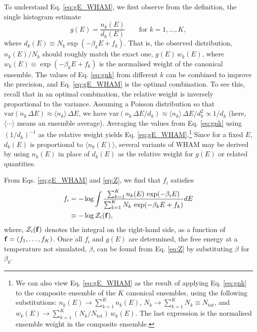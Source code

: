 \documentclass{gMOS2e}
\begin{document}
To understand Eq. \eqref{eq:gE_WHAM},
we first observe from the definition,
the single histogram estimate
%
\begin{equation}
g(E)
=
\frac{ n_k(E) }
     { d_k(E) }
\qquad
\mbox{for $k = 1, \dots, K$},
\label{eq:gnk}
\end{equation}
where $d_k(E) \equiv N_k \exp(-\beta_k E + f_k)$.
%
That is,
the observed distribution, $n_k(E)/N_k$
should roughly match the exact one, $g(E) \, w_k(E)$,
where $w_k(E) \equiv \exp(-\beta_k E + f_k)$
is the normalised weight of the canonical ensemble.
%
The values of Eq. \eqref{eq:gnk} from different $k$
can be combined to improve the precision,
and Eq. \eqref{eq:gE_WHAM}
is the optimal combination\cite{
roux1995, souaille2001, newman, frenkel}.
%
To see this,
recall that in an optimal combination,
the relative weight is inversely
proportional to the variance.
%
Assuming a Poisson distribution
so that $\mathrm{var}(n_k \, \Delta E) \approx \langle n_k \rangle \, \Delta E$,
%
%
we have
$\mathrm{var}(n_k \, \Delta E / d_k) \approx \langle n_k \rangle \, \Delta E/ d_k^2 \propto 1/ d_k$
(here, $\langle \cdots \rangle$ means an ensemble average).
%
Averaging the values from Eq. \eqref{eq:gnk}
using $(1/d_k)^{-1}$ as the relative weight yields
Eq. \eqref{eq:gE_WHAM}.\footnote{
We can also view Eq. \eqref{eq:gE_WHAM}
as the result of applying Eq. \eqref{eq:gnk}
to the composite ensemble of the $K$ canonical ensembles,
using the following substitutions:
$n_k(E) \rightarrow \sum_{k = 1}^K n_k(E)$,
$N_k \rightarrow \sum_{k = 1}^K N_k \equiv N_\mathrm{tot}$,
and
$w_k(E) \rightarrow \sum_{k = 1}^K (N_k/N_\mathrm{tot}) \, w_k(E)$.
%
The last expression is the normalised ensemble weight
in the composite ensemble.}
%
%
Since for a fixed $E$,
$d_k(E)$ is proportional to $\langle n_k(E) \rangle$,
several variants of WHAM
may be derived
by using $n_k(E)$ in place of $d_k(E)$
as the relative weight for
$g(E)$\cite{
shen1991}
or related quantities\cite{
woolf1994, crouzy1994, roux1995,
kastner2005, kastner2009, fenwick2008, kim2011}.
%




From Eqs. \eqref{eq:gE_WHAM} and \eqref{eq:Z},
we find that $f_i$ satisfies
%
\begin{align}
f_i
&=
-\log
  \int
    \frac{
      \sum_{k = 1}^K n_k(E) \, \exp(-\beta_i E)
    }
    {
      \sum_{k = 1}^K N_k \, \exp(-\beta_k E + f_k)
    }
    dE
\label{eq:f_WHAM}
\\
&\equiv
-\log \mathcal{Z}_i(\mathbf{f}),
\notag
\end{align}
%
where,
$\mathcal{Z}_i(\mathbf{f})$
denotes the integral on the right-hand side,
as a function of $\mathbf{f} = (f_1, \dots, f_K)$.
%
Once all $f_i$ and $g(E)$ are determined,
the free energy at a temperature not simulated, $\beta$,
can be found from Eq. \eqref{eq:Z}
by substituting $\beta$ for $\beta_k$.
\end{document}

